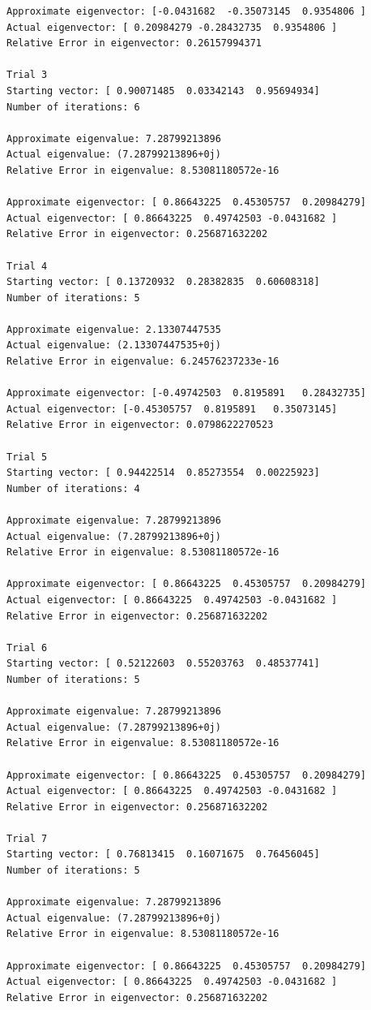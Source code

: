 \documentclass[10pt]{article}
\begin{document}
\begin{itemize}
\begin{verbatim}
Approximate eigenvector: [-0.0431682  -0.35073145  0.9354806 ]
Actual eigenvector: [ 0.20984279 -0.28432735  0.9354806 ]
Relative Error in eigenvector: 0.26157994371

Trial 3
Starting vector: [ 0.90071485  0.03342143  0.95694934]
Number of iterations: 6

Approximate eigenvalue: 7.28799213896
Actual eigenvalue: (7.28799213896+0j)
Relative Error in eigenvalue: 8.53081180572e-16

Approximate eigenvector: [ 0.86643225  0.45305757  0.20984279]
Actual eigenvector: [ 0.86643225  0.49742503 -0.0431682 ]
Relative Error in eigenvector: 0.256871632202

Trial 4
Starting vector: [ 0.13720932  0.28382835  0.60608318]
Number of iterations: 5

Approximate eigenvalue: 2.13307447535
Actual eigenvalue: (2.13307447535+0j)
Relative Error in eigenvalue: 6.24576237233e-16

Approximate eigenvector: [-0.49742503  0.8195891   0.28432735]
Actual eigenvector: [-0.45305757  0.8195891   0.35073145]
Relative Error in eigenvector: 0.0798622270523

Trial 5
Starting vector: [ 0.94422514  0.85273554  0.00225923]
Number of iterations: 4

Approximate eigenvalue: 7.28799213896
Actual eigenvalue: (7.28799213896+0j)
Relative Error in eigenvalue: 8.53081180572e-16

Approximate eigenvector: [ 0.86643225  0.45305757  0.20984279]
Actual eigenvector: [ 0.86643225  0.49742503 -0.0431682 ]
Relative Error in eigenvector: 0.256871632202

Trial 6
Starting vector: [ 0.52122603  0.55203763  0.48537741]
Number of iterations: 5

Approximate eigenvalue: 7.28799213896
Actual eigenvalue: (7.28799213896+0j)
Relative Error in eigenvalue: 8.53081180572e-16

Approximate eigenvector: [ 0.86643225  0.45305757  0.20984279]
Actual eigenvector: [ 0.86643225  0.49742503 -0.0431682 ]
Relative Error in eigenvector: 0.256871632202

Trial 7
Starting vector: [ 0.76813415  0.16071675  0.76456045]
Number of iterations: 5

Approximate eigenvalue: 7.28799213896
Actual eigenvalue: (7.28799213896+0j)
Relative Error in eigenvalue: 8.53081180572e-16

Approximate eigenvector: [ 0.86643225  0.45305757  0.20984279]
Actual eigenvector: [ 0.86643225  0.49742503 -0.0431682 ]
Relative Error in eigenvector: 0.256871632202


\end{verbatim}
\end{itemize}
\end{document}
